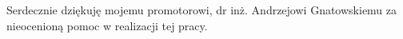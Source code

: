 \dedication{6cm}{%
    Serdecznie dziękuję mojemu promotorowi, dr inż. Andrzejowi Gnatowskiemu
    za nieocenioną pomoc w realizacji tej pracy.
    \\[1em]
}